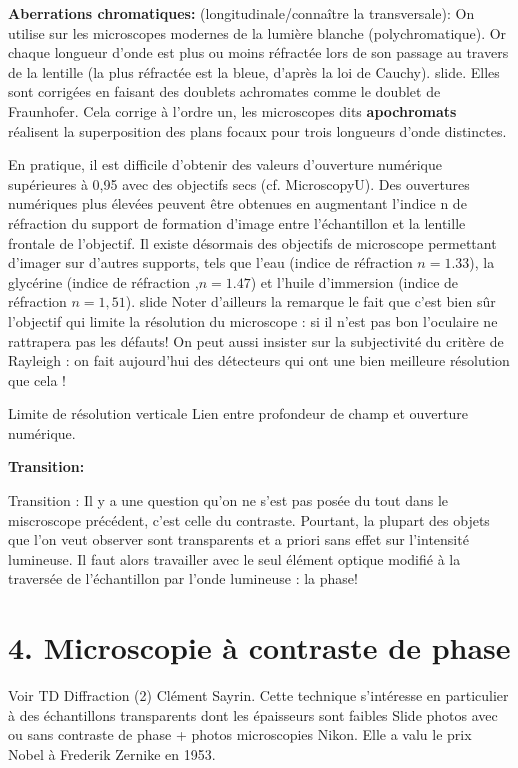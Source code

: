 \documentclass[french, a4paper, 10pt, twocolumn, landscape]{article}
\begin{document}
\textbf{Aberrations chromatiques:} (longitudinale/connaître la transversale): On utilise sur les microscopes
modernes de la lumière blanche (polychromatique). Or chaque longueur d’onde est plus ou moins réfractée lors de son passage au travers de la lentille (la plus réfractée est la bleue, d’après la loi de Cauchy).
slide. Elles sont corrigées en faisant des doublets achromates comme le doublet de Fraunhofer. Cela corrige à l’ordre un, les microscopes dits \textbf{apochromats} réalisent la superposition des plans focaux pour trois longueurs d’onde distinctes.


En pratique, il est difficile d’obtenir des valeurs d’ouverture numérique supérieures à 0,95 avec des objectifs secs
(cf. MicroscopyU). Des ouvertures numériques plus élevées peuvent être obtenues en augmentant l’indice n de réfraction
du support de formation d’image entre l’échantillon et la lentille frontale de l’objectif. Il existe désormais des
objectifs de microscope permettant d’imager sur d’autres supports, tels que l’eau (indice de réfraction $n =1.33$), la
glycérine (indice de réfraction ,$n= 1.47$) et l’huile d’immersion (indice de réfraction $n=1,51$). slide
Noter d’ailleurs la remarque le fait que c’est bien sûr l’objectif qui limite la résolution du microscope : si il n’est pas bon l’oculaire ne rattrapera pas les défauts! On peut aussi insister sur la subjectivité du critère de Rayleigh : on fait aujourd’hui des détecteurs qui ont une bien meilleure résolution que cela !

Limite de résolution verticale
Lien entre profondeur de champ et ouverture
numérique.

\textbf{Transition:}\medskip 

Transition : Il y a une question qu’on ne s’est pas posée du tout dans le miscroscope précédent, c’est celle du
contraste. Pourtant, la plupart des objets que l’on veut observer sont transparents et a priori sans effet sur l’intensité
lumineuse. Il faut alors travailler avec le seul élément optique modifié à la traversée de l’échantillon par l’onde
lumineuse : la phase!

\section*{4. Microscopie à contraste de phase}

Voir TD Diffraction (2) Clément Sayrin.
Cette technique s’intéresse en particulier à des échantillons transparents dont les
épaisseurs sont faibles Slide photos avec ou sans contraste de phase + photos
microscopies Nikon. Elle a valu le prix Nobel à Frederik Zernike en 1953.
\end{document}
